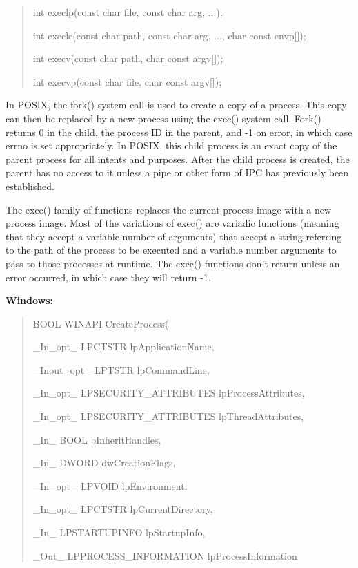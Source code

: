 \documentclass[letterpaper,10pt,titlepage]{article}
\newcommand{\tab}{\hspace*{2em}} %
\begin{document}
\begin{enumerate}
\begin{quote}
int execlp(const char \*file, const char \*arg, ...);

int execle(const char \*path, const char \*arg, ..., char \*const envp[]);

int execv(const char \*path, char \*const argv[]);

int execvp(const char \*file, char \*const argv[]);
\end{quote}

\tab In POSIX, the fork() system call is used to create a copy of a process. This copy can then be replaced by a new process using the exec() system call. Fork() returns 0 in the child, the process ID in the parent, and -1 on error, in which case errno is set appropriately. In POSIX, this child process is an exact copy of the parent process for all intents and purposes. After the child process is created, the parent has no access to it unless a pipe or other form of IPC has previously been established. \newline

\tab The exec() family of functions replaces the current process image with a new process image. Most of the variations of exec() are variadic functions (meaning that they accept a variable number of arguments) that accept a string referring to the path of the process to be executed and a variable number arguments to pass to those processes at runtime. The exec() functions don't return unless an error occurred, in which case they will return -1. \newline

\textbf{Windows:} 

\begin{quote}
BOOL WINAPI CreateProcess(

\tab\_In\_opt\_     LPCTSTR lpApplicationName,

\tab\_Inout\_opt\_  LPTSTR lpCommandLine,

\tab\_In\_opt\_     LPSECURITY\_ATTRIBUTES lpProcessAttributes,

\tab\_In\_opt\_     LPSECURITY\_ATTRIBUTES lpThreadAttributes,

\tab\_In\_         BOOL bInheritHandles,

\tab\_In\_         DWORD dwCreationFlags,

\tab\_In\_opt\_     LPVOID lpEnvironment,

\tab\_In\_opt\_     LPCTSTR lpCurrentDirectory,

\tab\_In\_         LPSTARTUPINFO lpStartupInfo,

\tab\_Out\_        LPPROCESS\_INFORMATION lpProcessInformation


\end{quote}
\end{enumerate}
\end{document}
